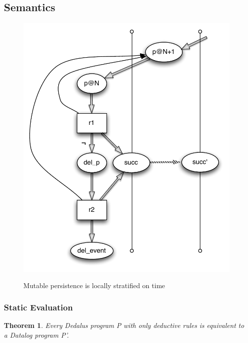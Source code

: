 \subsection{Semantics}


\begin{figure}[t]
  \centering
  \includegraphics[width=0.5\linewidth]{localstrat_rgg.pdf}
  \label{fig:lstrat}
  \caption{Mutable persistence is locally stratified on time}
\vspace{-8pt}
\end{figure}


\subsubsection{Static Evaluation}
\newtheorem{theorem}{Theorem}

\begin{theorem}
Every Dedalus program P with only deductive rules is equivalent to a Datalog program P'.
\end{theorem}

